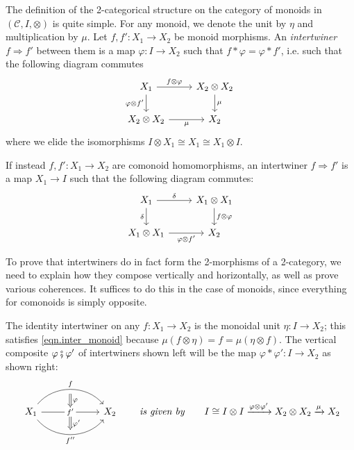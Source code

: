 \documentclass[11pt, one side, article]{memoir}
\theoremstyle{definition}
\theoremstyle{plain}
\newenvironment{definition}
  {\pushQED{\qed}\renewcommand{\qedsymbol}{$\lozenge$}\definitionx}
  {\popQED\enddefinitionx}
\newcommand{\cat}[1]{\mathcal{#1}}%
\newcommand{\then}{\mathbin{\fatsemi}}
\newcommand{\To}[2][]{\xrightarrow[#1]{#2}}
\newcommand{\imp}{\Rightarrow}
\newcommand{\tn}[1]{\textnormal{#1}}
\newcommand{\0}{\textsf{0}}
\newcommand{\1}{\tn{\textsf{1}}}
\newcommand{\hh}[2][]{#1 \tn{\textit{#2}} #1}
\newcommand{\qqby}{\hh[\qquad]{is given by}}
\begin{document}
The definition of the 2-categorical structure on the category of monoids in $(\cat{C},I,\otimes)$ is quite simple. For any monoid, we denote the unit by $\eta$ and multiplication by $\mu$.
\begin{definition}
Let $f,f'\colon X_1\to X_2$ be monoid morphisms. An \emph{intertwiner} $f\imp f'$ between them is a map $\varphi\colon I\to X_2$ such that  $f*\varphi=\varphi*f'$, i.e. such that the following diagram commutes
\begin{equation}\label{eqn.inter_monoid}
\begin{tikzcd}
	X_1\ar[r, "f\otimes \varphi"]\ar[d, "\varphi\otimes f'"']&
	X_2\otimes X_2\ar[d, "\mu"]\\
	X_2\otimes X_2\ar[r, "\mu"']&
	X_2
\end{tikzcd}
\end{equation}
where we elide the isomorphisms $I\otimes X_1\cong X_1\cong X_1\otimes I$.
\end{definition}

If instead $f,f'\colon X_1\to X_2$ are comonoid homomorphisms, an intertwiner $f\imp f'$ is a map $X_1\to I$ such that the following diagram commutes:
\begin{equation}\label{eqn.inter_comonoid}
\begin{tikzcd}
	X_1\ar[r, "\delta"]\ar[d, "\delta"']&
	X_1\otimes X_1\ar[d, "f\otimes\varphi"]\\
	X_1\otimes X_1\ar[r, "\varphi\otimes f'"']&
	X_2
\end{tikzcd}
\end{equation}

To prove that intertwiners do in fact form the 2-morphisms of a 2-category, we need to explain how they compose vertically and horizontally, as well as prove various coherences. It suffices to do this in the case of monoids, since everything for comonoids is simply opposite.

The identity intertwiner on any $f\colon X_1\to X_2$ is the monoidal unit $\eta\colon I\to X_2$; this satisfies \eqref{eqn.inter_monoid} because $\mu(f\otimes\eta)=f=\mu(\eta\otimes f)$. The vertical composite $\varphi\then\varphi'$ of intertwiners shown left will be the map $\varphi*\varphi'\colon I\to X_2$ as shown right:
\begin{equation}\label{eqn.def_vert}
\begin{tikzcd}[column sep=60pt]
	X_1\ar[r, bend left=50pt, "f", ""' name=a]\ar[r, "f'" description, "" name=b1, ""' name=b2]\ar[r, bend right=50pt, "f''"', "" name=c]&
	X_2
	\ar[from=a, to=b1, Rightarrow, "\varphi"]
	\ar[from=b2, to=c, Rightarrow, "\varphi'"]
\end{tikzcd}
\qqby
	I\cong I\otimes I\To{\varphi\otimes\varphi'}X_2\otimes X_2\To{\mu}X_2
\end{equation}
\end{document}
